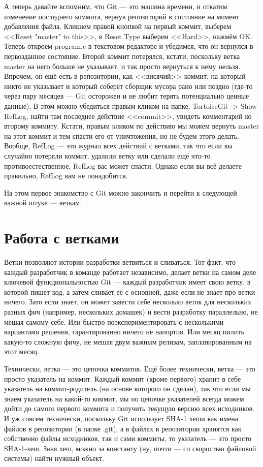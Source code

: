 \documentclass{../text-style}
\begin{document}
А теперь давайте вспомним, что Git --- это машина времени, и откатим изменение последнего коммита, вернув репозиторий в состояние на момент добавления файла. Кликнем правой кнопкой на первый коммит, выберем <<Reset "master" to this>>, в Reset Type выберем <<Hard>>, нажмём OK. Теперь откроем program.c в текстовом редакторе и убедимся, что он вернулся в первозданное состояние. Второй коммит потерялся, кстати, поскольку ветка master на него больше не указывает, и так просто вернуться к нему нельзя. Впрочем, он ещё есть в репозитории, как <<висячий>> коммит, на который никто не указывает и который соберёт сборщик мусора рано или поздно (где-то через пару месяцев --- Git осторожен и не любит терять потенциально ценные данные). В этом можно убедиться правым кликом на папке, TortoiseGit -> Show RefLog, найти там последнее действие <<commit>>, увидеть комментарий ко второму коммиту. Кстати, правым кликом по действию мы можем вернуть master на этот коммит и тем спасти его от уничтожения, но не будем этого делать. Вообще, RefLog --- это журнал всех действий с ветками, так что если вы случайно потеряли коммит, удалили ветку или сделали ещё что-то противоестественное, RefLog вас может спасти. Однако если вы всё делаете правильно, RefLog вам не понадобится.

На этом первое знакомство с Git можно закончить и перейти к следующей важной штуке --- веткам.

\section{Работа с ветками}

Ветки позволяют истории разработки ветвиться и сливаться. Тот факт, что каждый разработчик в команде работает независимо, делает ветки на самом деле ключевой функциональностью Git --- каждый разработчик имеет свою ветку, в которой пишет код, а затем сливает её с основной, даже если не знает про ветки ничего. Зато если знает, он может завести себе несколько веток для нескольких разных фич (например, нескольких домашек) и вести разработку параллельно, не мешая самому себе. Или быстро поэкспериментировать с несколькими вариантами решения, гарантированно ничего не напортив. Или месяц пилить какую-то сложную фичу, не мешая двум важным релизам, запланированным на этот месяц.

Технически, ветка --- это цепочка коммитов. Ещё более технически, ветка --- это просто указатель на коммит. Каждый коммит (кроме первого) хранит в себе указатель на коммит-родитель (на основе которого он сделан), так что если мы знаем указатель на какой-то коммит, мы по цепочке указателей всегда можем дойти до самого первого коммита и получить текущую версию всех исходников. И уж совсем технически, поскольку Git использует SHA-1 хеши как имена файлов в репозитории (в папке .git), а в файлах в репозитории хранятся как собственно файлы исходников, так и сами коммиты, то указатель --- это просто SHA-1-хеш. Зная хеш, можно за константу (ну, почти --- со скоростью файловой системы) найти нужный объект.
\end{document}
